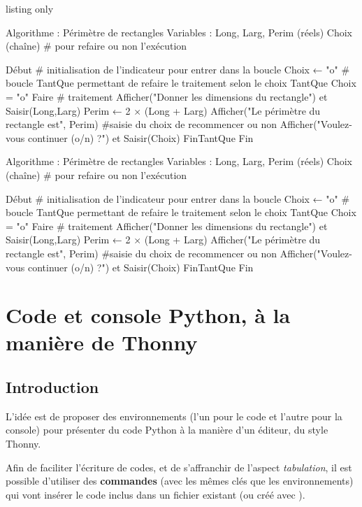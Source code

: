 \begin{PresCodeTexPL}{listing only}
\begin{PseudoCodePiton}[Lignes=false,Filigrane=false,Couleurs=false]{}
Algorithme : Périmètre de rectangles
Variables  : Long, Larg, Perim (réels)
             Choix (chaîne) # pour refaire ou non l'exécution

Début
	# initialisation de l'indicateur pour entrer dans la boucle
	Choix ← "o"
	# boucle TantQue permettant de refaire le traitement selon le choix
	TantQue Choix = "o" Faire
		# traitement
		Afficher("Donner les dimensions du rectangle") et Saisir(Long,Larg)
		Perim ← 2 × (Long + Larg)
		Afficher("Le périmètre du rectangle est", Perim)
		#saisie du choix de recommencer ou non
		Afficher("Voulez-vous continuer (o/n) ?") et Saisir(Choix)
	FinTantQue
Fin
\end{PseudoCodePiton}
\end{PresCodeTexPL}

\begin{PseudoCodePiton}[Lignes=false,Filigrane=false,Couleurs=false]{}
Algorithme : Périmètre de rectangles
Variables  : Long, Larg, Perim (réels)
             Choix (chaîne) # pour refaire ou non l'exécution

Début
	# initialisation de l'indicateur pour entrer dans la boucle
	Choix ← "o"
	# boucle TantQue permettant de refaire le traitement selon le choix
	TantQue Choix = "o" Faire
		# traitement
		Afficher("Donner les dimensions du rectangle") et Saisir(Long,Larg)
		Perim ← 2 × (Long + Larg)
		Afficher("Le périmètre du rectangle est", Perim)
		#saisie du choix de recommencer ou non
		Afficher("Voulez-vous continuer (o/n) ?") et Saisir(Choix)
	FinTantQue
Fin
\end{PseudoCodePiton}

\newpage

\section{Code et console Python, à la manière de Thonny}\label{pitonthonny}

\subsection{Introduction}

\begin{noteblock}
 L'idée est de proposer des environnements (l'un pour le code et l'autre pour la console) pour présenter du code \textsf{Python} à la manière d'un éditeur, du style \textsf{Thonny}.

\smallskip

 Afin de faciliter l'écriture de codes, et de s'affranchir de l'aspect \textit{tabulation}, il est possible d'utiliser des \textbf{commandes} (avec les mêmes clés que les environnements) qui vont insérer le code inclus dans un fichier existant (ou créé avec ).
\end{noteblock}

